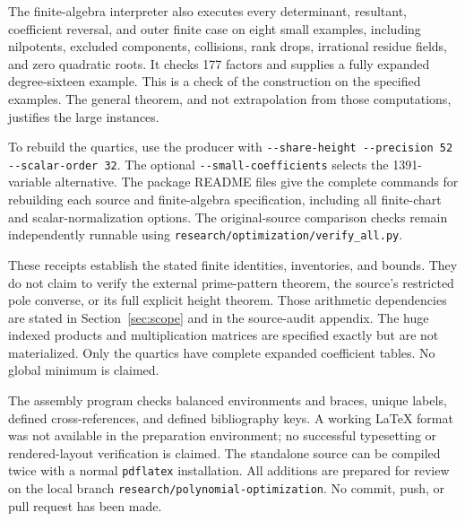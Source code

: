 The finite-algebra interpreter also executes every determinant,
resultant, coefficient reversal, and outer finite case on eight small
examples, including nilpotents, excluded components, collisions,
rank drops, irrational residue fields, and zero quadratic roots. It
checks 177 factors and supplies a fully expanded degree-sixteen
example. This is a check of the construction on the specified examples.
The general theorem, and not extrapolation from those computations,
justifies the large instances.

To rebuild the quartics, use the producer with
\nolinkurl{--share-height --precision 52 --scalar-order 32}.
The optional \nolinkurl{--small-coefficients} selects the
1391-variable alternative. The package README files give the complete
commands for rebuilding each source and finite-algebra specification,
including all finite-chart and scalar-normalization options.
The original-source comparison checks remain independently runnable
using \nolinkurl{research/optimization/verify_all.py}.

These receipts establish the stated finite identities, inventories,
and bounds. They do not claim to verify the external prime-pattern
theorem, the source's restricted pole converse, or its full explicit
height theorem. Those arithmetic dependencies are stated in
Section~\ref{sec:scope} and in the source-audit appendix.
The huge indexed products and multiplication matrices are specified
exactly but are not materialized. Only the quartics have complete
expanded coefficient tables. No global minimum is claimed.

The assembly program checks balanced environments and braces, unique
labels, defined cross-references, and defined bibliography keys. A
working LaTeX format was not available in the preparation environment;
no successful typesetting or rendered-layout verification is claimed.
The standalone source can be compiled twice with a normal
\texttt{pdflatex} installation. All additions are prepared for review
on the local branch \nolinkurl{research/polynomial-optimization}.
No commit, push, or pull request has been made.
